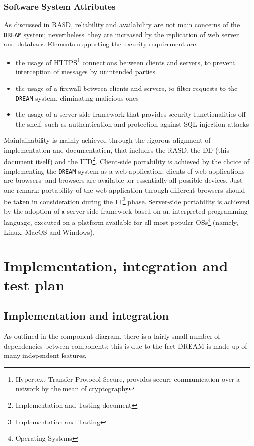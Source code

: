 \documentclass{article}
\begin{document}
\subsubsection{Software System Attributes}
As discussed in RASD, reliability and availability are not main concerns of the \verb|DREAM| system; nevertheless, they are increased by the replication of web server and database.
\newline
Elements supporting the security requirement are:
\begin{itemize}
    \item the usage of HTTPS\footnote{Hypertext Transfer Protocol Secure, provides secure communication over a network by the mean of cryptography} connections between clients and servers, to prevent interception of messages by unintended parties
    \item the usage of a firewall between clients and servers, to filter requests to the \verb|DREAM| system, eliminating malicious ones
    \item the usage of a server-side framework that provides security functionalities off-the-shelf, such as authentication and protection against SQL injection attacks
\end{itemize}
\newline
Maintainability is mainly achieved through the rigorous alignment of implementation and documentation, that includes the RASD, the DD (this document itself) and the ITD\footnote{Implementation and Testing document}.
\newline
Client-side portability is achieved by the choice of implementing the \verb|DREAM| system as a web application: clients of web applications are browsers, and browsers are available for essentially all possible devices. Just one remark: portability of the web application through different browsers should be taken in consideration during the IT\footnote{Implementation and Testing} phase. Server-side portability is achieved by the adoption of a server-side framework based on an interpreted programming language, executed on a platform available for all most popular OSs\footnote{Operating Systems} (namely, Linux, MacOS and Windows).
\newpage
\section{Implementation, integration and test plan}
\subsection{Implementation and integration}
\setlength{\parskip}{.5em}
As outlined in the component diagram, there is a fairly small number of dependencies between components; this is due to the fact DREAM is made up of many independent features.
\end{document}
